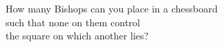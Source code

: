 \documentclass[preview]{standalone}
\begin{document}
\begin{center}
How many Bishops can you place in a chessboard \\ such that none on them control \\ the square on which another lies?
\end{center}
\end{document}
